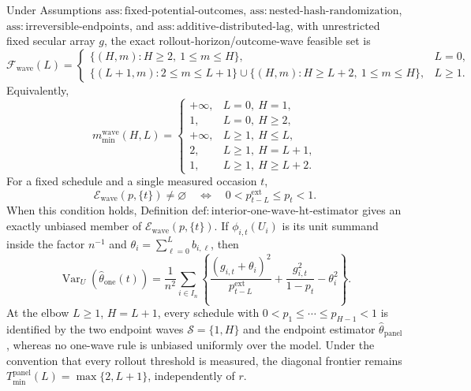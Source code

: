 Under Assumptions \(\mathrm{ass:fixed\text{-}potential\text{-}outcomes}\), \(\mathrm{ass:nested\text{-}hash\text{-}randomization}\), \(\mathrm{ass:irreversible\text{-}endpoints}\), and \(\mathrm{ass:additive\text{-}distributed\text{-}lag}\), with unrestricted fixed secular array \(g\), the exact rollout-horizon/outcome-wave feasible set is
\[
 \mathcal F_{\mathrm{wave}}(L)=
 \begin{cases}
 \{(H,m):H\geq2,\ 1\leq m\leq H\},&L=0,\\
 \{(L+1,m):2\leq m\leq L+1\}
 \mathbin{\cup}
 \{(H,m):H\geq L+2,\ 1\leq m\leq H\},&L\geq1.
 \end{cases}
\]
Equivalently,
\[
 m_{\min}^{\mathrm{wave}}(H,L)=
 \begin{cases}
 +\infty,&L=0,\ H=1,\\
 1,&L=0,\ H\geq2,\\
 +\infty,&L\geq1,\ H\leq L,\\
 2,&L\geq1,\ H=L+1,\\
 1,&L\geq1,\ H\geq L+2.
 \end{cases}
\]
For a fixed schedule and a single measured occasion \(t\),
\[
 \mathcal E_{\mathrm{wave}}(p,\{t\})\ne\varnothing
 \quad\Longleftrightarrow\quad
 0<p^{\mathrm{ext}}_{t-L}\leq p_t<1.
\]
When this condition holds, Definition \(\mathrm{def:interior\text{-}one\text{-}wave\text{-}ht\text{-}estimator}\) gives an exactly unbiased member of \(\mathcal E_{\mathrm{wave}}(p,\{t\})\).  If \(\phi_{i,t}(U_i)\) is its unit summand inside the factor \(n^{-1}\) and \(\theta_i=\sum_{\ell=0}^{L}b_{i,\ell}\), then
\[
 \operatorname{Var}_U\!\left(\widehat\theta_{\mathrm{one}}(t)\right)
 =\frac1{n^2}\sum_{i\in I_n}
 \left\{
 \frac{(g_{i,t}+\theta_i)^2}{p^{\mathrm{ext}}_{t-L}}
 +\frac{g_{i,t}^2}{1-p_t}-\theta_i^2
 \right\}.
\]
At the elbow \(L\geq1\), \(H=L+1\), every schedule with \(0<p_1\leq\cdots\leq p_{H-1}<1\) is identified by the two endpoint waves \(\mathcal S=\{1,H\}\) and the endpoint estimator \(\widehat\theta_{\mathrm{panel}}\), whereas no one-wave rule is unbiased uniformly over the model.  Under the convention that every rollout threshold is measured, the diagonal frontier remains \(T_{\min}^{\mathrm{panel}}(L)=\max\{2,L+1\}\), independently of \(r\).